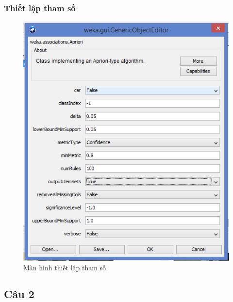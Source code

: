 \documentclass{article}
\begin{document}
\subsubsection{Thiết lập tham số}
\begin{figure}[H]
	\centering
	\caption{Màn hình thiết lập tham số}
	\includegraphics[scale = 0.5]{para}
\end{figure}

\subsection{Câu 2}
\end{document}
